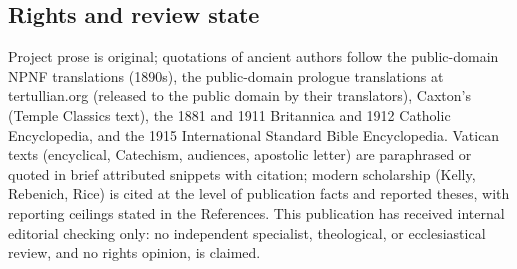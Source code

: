\subsection{Rights and review state}

Project prose is original; quotations of ancient authors follow the
public-domain NPNF translations (1890s), the public-domain prologue
translations at tertullian.org (released to the public domain by their
translators), Caxton's  (Temple Classics text), the 1881
and 1911 Britannica and 1912 Catholic Encyclopedia, and the 1915
International Standard Bible Encyclopedia. Vatican texts (encyclical,
Catechism, audiences, apostolic letter) are paraphrased or quoted in brief
attributed snippets with citation; modern scholarship (Kelly, Rebenich, Rice)
is cited at the level of publication facts and reported theses, with
reporting ceilings stated in the References. This publication has received
internal editorial checking only: no independent specialist, theological, or
ecclesiastical review, and no rights opinion, is claimed.
